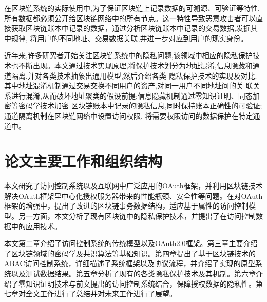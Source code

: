 在区块链系统的实际使用中,为了保证区块链上记录数据的可溯源、可验证等特性,所有数据都必须公开给区块链网络中的所有节点。这一特性导致恶意攻击者可以直接获取区块链账本中记录的数据，通过分析区块链账本中记录的交易数据,发掘其中规律, 将用户的不同地址、交易数据关联,并进一步对应到用户的现实身份。 
	
近年来,许多研究者开始关注区块链系统中的隐私问题,该领域中相应的隐私保护技术也不断出现。本文通过技术实现原理,将保护技术划分为地址混淆,信息隐藏和通道隔离,并对各类技术抽象出通用模型,然后介绍各类 隐私保护技术的实现及对比.其中地址混淆机制通过交易交换不同用户的资产,对同一用户不同地址间的关 联关系进行混淆,从而破坏地址聚类的假设前提;信息隐藏机制通过零知识证明、同态加密等密码学技术加密 区块链账本中记录的隐私信息,同时保持账本正确性的可验证;通道隔离机制在区块链网络中设置访问权限, 将需要权限访问的数据保护在特定通道中。

\section{论文主要工作和组织结构}

本文研究了访问控制系统以及互联网中广泛应用的OAuth框架，并利用区块链技术解决OAuth框架里中心化授权服务器带来的性能瓶颈、安全性等问题。在对OAuth框架的增强中，提出了改进的区块链事务数据结构，适应基于属性的访问控制模型。另一方面，本文分析了现有区块链中的隐私保护技术，并提出了在访问控制数据中的应用技术。

本文第二章介绍了访问控制系统的传统模型以及OAuth2.0框架。第三章主要介绍了区块链领域的密码学及共识算法等基础知识。第四章提出了基于区块链技术的ABAC访问控制系统，详细描述了系统框架以及协议流程，并介绍了实现的原型系统以及测试数据结果。第五章分析了现有的各类隐私保护技术及其机制。第六章介绍了零知识证明技术与前文提出的访问控制系统结合，保障授权数据的隐私性。第七章对全文工作进行了总结并对未来工作进行了展望。
